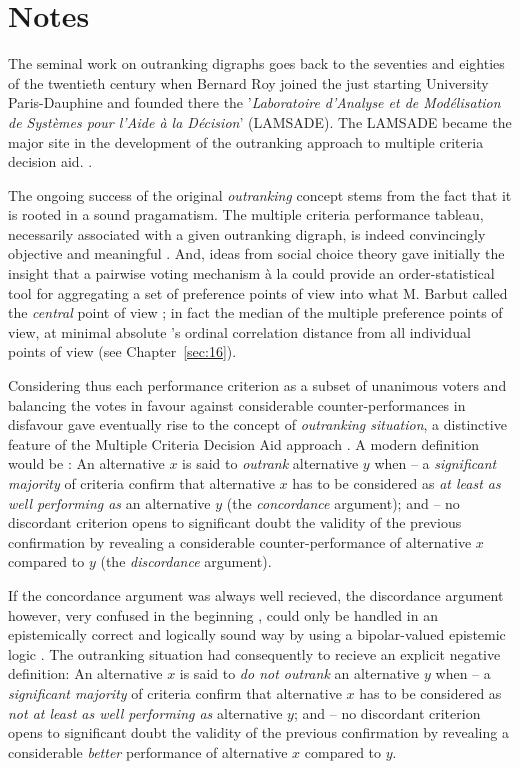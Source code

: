 \section*{Notes}

The seminal work on outranking digraphs goes back to the seventies and eighties of the twentieth century when Bernard Roy  joined the just starting University Paris-Dauphine and founded there the '\emph{Laboratoire d’Analyse et de Modélisation de Systèmes pour l’Aide à la Décision}' (LAMSADE). The LAMSADE became the major site in the development of the outranking approach to multiple criteria decision aid. \citep*{ROY-1993}.

The ongoing success of the original \emph{outranking} concept stems from the fact that it is rooted in a sound pragamatism. The multiple criteria performance tableau, necessarily associated with a given outranking digraph, is indeed convincingly objective and meaningful \citep{ROY-1991}. And, ideas from social choice theory gave initially the insight that a pairwise voting mechanism à la \Condorcet could provide an order-statistical tool for aggregating a set of preference points of view into what M. Barbut called the \emph{central} \Condorcet point of view \citep{BAR-1980}; in fact the median of the multiple preference points of view, at minimal absolute \Kendall's ordinal correlation distance from all individual points of view (see Chapter~\ref{sec:16}).

Considering thus each performance criterion as a subset of unanimous voters and balancing the votes in favour against considerable counter-performances in disfavour gave eventually rise to the concept of \emph{outranking situation}, a distinctive feature of the Multiple Criteria Decision Aid approach \citep{BIS-2015}.  A modern definition would be : An alternative $x$ is said to \emph{outrank} alternative $y$ when – a \emph{significant majority} of criteria confirm that alternative $x$ has to be considered as \emph{at least as well performing as} an alternative $y$ (the \emph{concordance} argument); and – no discordant criterion opens to significant doubt the validity of the previous confirmation by revealing a considerable counter-performance of alternative $x$ compared to $y$ (the \emph{discordance} argument).

If the concordance argument was always well recieved, the discordance argument however, very confused in the beginning \citep{ROY-1966}, could only be handled in an epistemically correct and logically sound way by using a bipolar-valued epistemic logic \citep{BIS-2013}. The outranking situation had consequently to recieve an explicit negative definition: An alternative $x$ is said to \emph{do not outrank} an alternative $y$ when – a \emph{significant majority} of criteria confirm that alternative $x$ has to be considered as \emph{not at least as well performing as} alternative $y$; and – no discordant criterion opens to significant doubt the validity of the previous confirmation by revealing a considerable \emph{better} performance of alternative $x$ compared to $y$.

